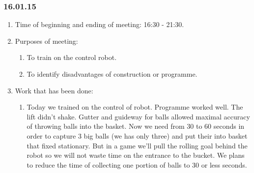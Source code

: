 \subsubsection{16.01.15}
\begin{enumerate}
	
	\item Time of beginning and ending of meeting: 16:30 - 21:30.
	
	\item Purposes of meeting: 
	\begin{enumerate}
		
		\item To train on the control robot.
		
		\item To identify disadvantages of construction or programme.
		
	\end{enumerate}

	\item Work that has been done:
	\begin{enumerate}
		
		\item Today we trained on the control of robot. Programme worked well. The lift didn't shake. Gutter and guideway for balls allowed maximal accuracy of throwing balls into the basket. Now we need from 30 to 60 seconds in order to capture 3 big balls (we has only three) and put their into basket that fixed stationary. But in a game we'll pull the rolling goal behind the robot so we will not waste time on the entrance to the bucket. We plans to reduce the time of collecting one portion of balls to 30 or less seconds.
		

\end{enumerate}
\end{enumerate}
